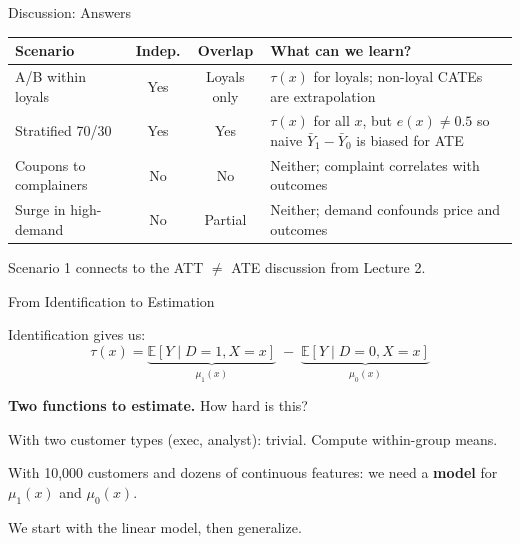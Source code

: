 \documentclass[aspectratio=169, 11pt]{beamer}
\newcommand{\E}{\mathbb{E}}
\begin{document}
\begin{frame}{Discussion: Answers}
 
\begin{center}
\small
\begin{tabular}{p{3.5cm}ccp{4.5cm}}
\toprule
\textbf{Scenario} & \textbf{Indep.} & \textbf{Overlap} & \textbf{What can we learn?} \\
\midrule
A/B within loyals & \textcolor{sbgreen}{Yes} & \textcolor{warnred}{Loyals only} & $\tau(x)$ for loyals; non-loyal CATEs are extrapolation \\[0.5em]
Stratified 70/30 & \textcolor{sbgreen}{Yes} & \textcolor{sbgreen}{Yes} & $\tau(x)$ for all $x$, but $e(x) \neq 0.5$ so naive $\bar{Y}_1 - \bar{Y}_0$ is biased for ATE \\[0.5em]
Coupons to complainers & \textcolor{warnred}{No} & \textcolor{warnred}{No} & Neither; complaint correlates with outcomes \\[0.5em]
Surge in high-demand & \textcolor{warnred}{No} & \textcolor{warnred}{Partial} & Neither; demand confounds price and outcomes \\
\bottomrule
\end{tabular}
\end{center}
 
\bigskip
 
Scenario 1 connects to the ATT $\neq$ ATE discussion from Lecture 2.

\end{frame}
 
\begin{frame}{From Identification to Estimation}
 
Identification gives us:
\[
\tau(x) = \underbrace{\E[Y \mid D = 1, X = x]}_{\mu_1(x)} \;-\; \underbrace{\E[Y \mid D = 0, X = x]}_{\mu_0(x)}
\]
 
\bigskip
 
\textbf{Two functions to estimate.} How hard is this?
 
\bigskip
 
With two customer types (exec, analyst): trivial. Compute within-group means.
 
\bigskip
 
With 10,000 customers and dozens of continuous features: we need a \textbf{model} for $\mu_1(x)$ and $\mu_0(x)$.
 
\bigskip
 
We start with the linear model, then generalize.
\end{frame}
 
\end{document}
